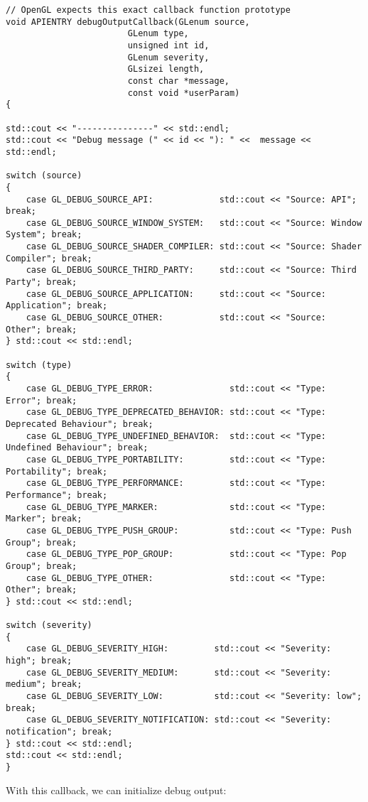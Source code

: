 \documentclass[8pt, table, xcdraw]{article}%
\begin{document}
\begin{lstlisting}
// OpenGL expects this exact callback function prototype
void APIENTRY debugOutputCallback(GLenum source, 
                        GLenum type, 
                        unsigned int id, 
                        GLenum severity, 
                        GLsizei length, 
                        const char *message, 
                        const void *userParam)
{

std::cout << "---------------" << std::endl;
std::cout << "Debug message (" << id << "): " <<  message << std::endl;

switch (source)
{
    case GL_DEBUG_SOURCE_API:             std::cout << "Source: API"; break;
    case GL_DEBUG_SOURCE_WINDOW_SYSTEM:   std::cout << "Source: Window System"; break;
    case GL_DEBUG_SOURCE_SHADER_COMPILER: std::cout << "Source: Shader Compiler"; break;
    case GL_DEBUG_SOURCE_THIRD_PARTY:     std::cout << "Source: Third Party"; break;
    case GL_DEBUG_SOURCE_APPLICATION:     std::cout << "Source: Application"; break;
    case GL_DEBUG_SOURCE_OTHER:           std::cout << "Source: Other"; break;
} std::cout << std::endl;

switch (type)
{
    case GL_DEBUG_TYPE_ERROR:               std::cout << "Type: Error"; break;
    case GL_DEBUG_TYPE_DEPRECATED_BEHAVIOR: std::cout << "Type: Deprecated Behaviour"; break;
    case GL_DEBUG_TYPE_UNDEFINED_BEHAVIOR:  std::cout << "Type: Undefined Behaviour"; break; 
    case GL_DEBUG_TYPE_PORTABILITY:         std::cout << "Type: Portability"; break;
    case GL_DEBUG_TYPE_PERFORMANCE:         std::cout << "Type: Performance"; break;
    case GL_DEBUG_TYPE_MARKER:              std::cout << "Type: Marker"; break;
    case GL_DEBUG_TYPE_PUSH_GROUP:          std::cout << "Type: Push Group"; break;
    case GL_DEBUG_TYPE_POP_GROUP:           std::cout << "Type: Pop Group"; break;
    case GL_DEBUG_TYPE_OTHER:               std::cout << "Type: Other"; break;
} std::cout << std::endl;

switch (severity)
{
    case GL_DEBUG_SEVERITY_HIGH:         std::cout << "Severity: high"; break;
    case GL_DEBUG_SEVERITY_MEDIUM:       std::cout << "Severity: medium"; break;
    case GL_DEBUG_SEVERITY_LOW:          std::cout << "Severity: low"; break;
    case GL_DEBUG_SEVERITY_NOTIFICATION: std::cout << "Severity: notification"; break;
} std::cout << std::endl;
std::cout << std::endl;
}
\end{lstlisting}

With this callback, we can initialize debug output:
\end{document}
